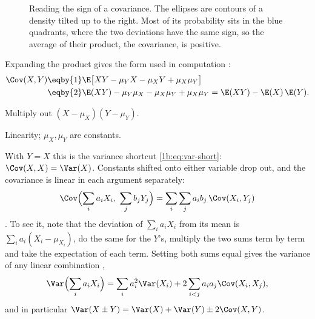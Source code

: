 \begin{figure}[htbp]
\centering
{}
\caption{Reading the sign of a covariance. The ellipses are contours of a
density tilted up to the right. Most of its probability sits in the blue
quadrants, where the two deviations have the same sign, so the average of
their product, the covariance, is positive.}
\label{1b:fig:quadrants}
\end{figure}

Expanding the product gives the form used in computation
:
\begin{align}
  \Cov(X,Y)
  &\eqby{1} \E\bigl[XY-\mu_YX-\mu_XY+\mu_X\mu_Y\bigr]\nonumber\\
  &\eqby{2} \E(XY)-\mu_Y\mu_X-\mu_X\mu_Y+\mu_X\mu_Y
   = \E(XY)-\E(X)\,\E(Y) .
  \label{1b:eq:cov-short}
\end{align}
\begin{explain}
  \item Multiply out $(X-\mu_X)(Y-\mu_Y)$.
  \item Linearity; $\mu_X,\mu_Y$ are constants.
\end{explain}
With $Y=X$ this is the variance shortcut \eqref{1b:eq:var-short}:
$\Cov(X,X)=\Var(X)$. Constants shifted onto either variable drop out, and the
covariance is linear in each argument separately:
\begin{equation}
  \Cov\Bigl(\sum_{i}a_iX_i,\ \sum_{j}b_jY_j\Bigr)=\sum_{i}\sum_{j}a_ib_j\,\Cov(X_i,Y_j)
  \label{1b:eq:bilinear}
\end{equation}
. To see it, note that the deviation of
$\sum_ia_iX_i$ from its mean is $\sum_ia_i(X_i-\mu_{X_i})$, do the same for
the $Y$'s, multiply the two sums term by term and take the expectation of
each term. Setting both sums equal gives the variance of any linear
combination ,
\begin{equation}
  \Var\Bigl(\sum_ia_iX_i\Bigr)=\sum_ia_i^2\Var(X_i)+2\sum_{i<j}a_ia_j\Cov(X_i,X_j),
  \label{1b:eq:var-comb}
\end{equation}
and in particular $\Var(X\pm Y)=\Var(X)+\Var(Y)\pm2\Cov(X,Y)$.

